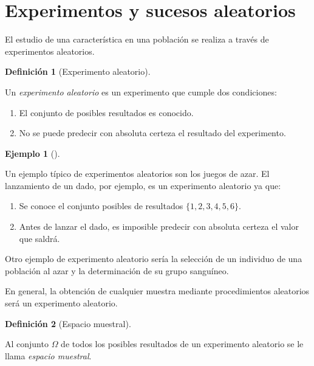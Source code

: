 \documentclass[
  a4paper,
]{scrreport}
\providecommand{\tightlist}{%
  \setlength{\itemsep}{0pt}\setlength{\parskip}{0pt}}\usepackage{longtable,booktabs,array}
\theoremstyle{plain}
\theoremstyle{definition}
\newtheorem{definition}{Definición}[chapter]
\theoremstyle{definition}
\newtheorem{example}{Ejemplo}[chapter]
\theoremstyle{remark}
\begin{document}
\section{Experimentos y sucesos
aleatorios}\label{experimentos-y-sucesos-aleatorios}

El estudio de una característica en una población se realiza a través de
experimentos aleatorios.

\begin{definition}[Experimento
aleatorio]\protect\hypertarget{def-experimento-aleatorio}{}\label{def-experimento-aleatorio}

Un \emph{experimento aleatorio} es un experimento que cumple dos
condiciones:

\begin{enumerate}
\def\labelenumi{\arabic{enumi}.}
\tightlist
\item
  El conjunto de posibles resultados es conocido.
\item
  No se puede predecir con absoluta certeza el resultado del
  experimento.
\end{enumerate}

\end{definition}

\begin{example}[]\protect\hypertarget{exm-experimento-aleatorio}{}\label{exm-experimento-aleatorio}

Un ejemplo típico de experimentos aleatorios son los juegos de azar. El
lanzamiento de un dado, por ejemplo, es un experimento aleatorio ya que:

\begin{enumerate}
\def\labelenumi{\arabic{enumi}.}
\tightlist
\item
  Se conoce el conjunto posibles de resultados \(\{1,2,3,4,5,6\}\).
\item
  Antes de lanzar el dado, es imposible predecir con absoluta certeza el
  valor que saldrá.
\end{enumerate}

Otro ejemplo de experimento aleatorio sería la selección de un individuo
de una población al azar y la determinación de su grupo sanguíneo.

En general, la obtención de cualquier muestra mediante procedimientos
aleatorios será un experimento aleatorio.

\end{example}

\begin{definition}[Espacio
muestral]\protect\hypertarget{def-espacio-muestral}{}\label{def-espacio-muestral}

Al conjunto \(\Omega\) de todos los posibles resultados de un
experimento aleatorio se le llama \emph{espacio muestral}.

\end{definition}
\end{document}
